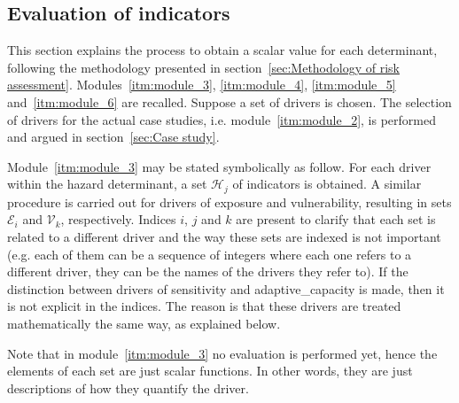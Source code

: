 \subsection{Evaluation of indicators}
\label{sec:Evaluation of indicators}
This section explains the process to obtain a scalar value for each \gls{determinant}, following the methodology presented in section~\ref{sec:Methodology of risk assessment}. Modules~\ref{itm:module_3}, \ref{itm:module_4}, \ref{itm:module_5} and~\ref{itm:module_6} are recalled.
Suppose a set of \glspl{driver} is chosen. The selection of \glspl{driver} for the actual case studies, i.e. module~\ref{itm:module_2}, is performed and argued in section~\ref{sec:Case study}.

Module~\ref{itm:module_3} may be stated symbolically as follow. For each \gls{driver} within the \gls{hazard} \gls{determinant}, a set $\mathcal{H}_j$ of \glspl{indicator} is obtained. A similar procedure is carried out for \glspl{driver} of \gls{exposure} and \gls{vulnerability}, resulting in sets $\mathcal{E}_i$ and $\mathcal{V}_k$, respectively. Indices $i$, $j$ and $k$ are present to clarify that each set is related to a different \gls{driver} and the way these sets are indexed is not important (e.g. each of them can be a sequence of integers where each one refers to a different \gls{driver}, they can be the names of the \glspl{driver} they refer to).
If the distinction between \glspl{driver} of \gls{sensitivity} and \gls{adaptive_capacity} is made, then it is not explicit in the indices. The reason is that these \glspl{driver} are treated mathematically the same way, as explained below.

Note that in module~\ref{itm:module_3} no evaluation is performed yet, hence the elements of each set are just scalar functions. In other words, they are just descriptions of how they quantify the \gls{driver}.

